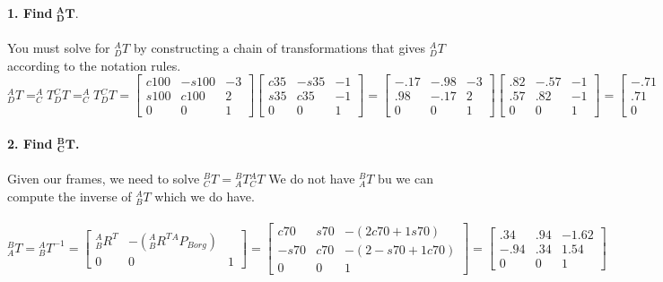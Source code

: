 \documentclass{article}
\begin{document}
\textbf{1. Find} $\mathbf{{}^A_D T}$.\\\\
You must solve for $^A_DT$ by constructing a chain of transformations that gives $^A_DT$ according to the notation rules.\\
${}^A_D T=^A_C T {}^C_D T=^A_C T {}^C_D T=\begin{bmatrix}
c100 & -s100 & -3\\
s100 & c100 & 2\\
0 & 0 & 1
\end{bmatrix} \begin{bmatrix}
c35 & -s35 & -1\\
s35 & c35 & -1\\
0 & 0 & 1
\end{bmatrix}=\begin{bmatrix}
-.17 & -.98 & -3\\
.98 & -.17 & 2\\
0 & 0 & 1
\end{bmatrix} \begin{bmatrix}
.82 & -.57 & -1\\
.57 & .82 & -1\\
0 & 0 & 1
\end{bmatrix}=\begin{bmatrix}
-.71 & -.71 & -1.85\\
.71 & -.71 & 1.19\\
0 & 0 & 1
\end{bmatrix}$\\\\
\newpage
\textbf{2. Find $\mathbf{{}^B_C T}$.}\\\\
Given our frames, we need to solve ${}^B_C T= {}^B_A T {}^A_C T$  We do not have ${}^B_A T$ bu we can compute the inverse of ${}^A_B T$
which we do have. \\\\
${}^B_A T={}^A_B T^{-1}=\begin{bmatrix}
{}^A_B R^T & -({}^A_B R^T {}^A P_{Borg}) \\
0 & 0 & 1
\end{bmatrix}=\begin{bmatrix}
c70 & s70 & -(2c70 + 1s70)\\
-s70 & c70 & -(2-s70 + 1c70)\\
0 & 0 & 1
\end{bmatrix}=\begin{bmatrix}
.34 & .94 & -1.62\\
-.94 & .34 & 1.54\\
0 & 0 & 1
\end{bmatrix}$
\end{document}
